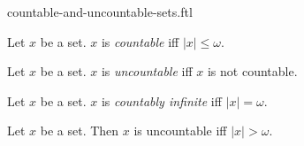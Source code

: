 \documentclass{naproche-library}
\begin{document}
\begin{smodule}[title=Countable and Uncountable Sets]{countable-and-uncountable-sets.ftl}

\begin{definition}[forthel,id=SET_THEORY_07_8808604616359936]
  Let $x$ be a set.
  $x$ is \emph{countable} iff $|x| \leq \omega$.
\end{definition}

\begin{definition}[forthel,id=SET_THEORY_07_2935263915409408]
  Let $x$ be a set.
  $x$ is \emph{uncountable} iff $x$ is not countable.
\end{definition}

\begin{definition}[forthel,id=SET_THEORY_07_5679866426949632]
  Let $x$ be a set.
  $x$ is \emph{countably infinite} iff $|x| = \omega$.
\end{definition}

\begin{proposition}[forthel,id=SET_THEORY_07_4281623468048384]
  Let $x$ be a set.
  Then $x$ is uncountable iff $|x| > \omega$.
\end{proposition}
\end{smodule}
\end{document}
